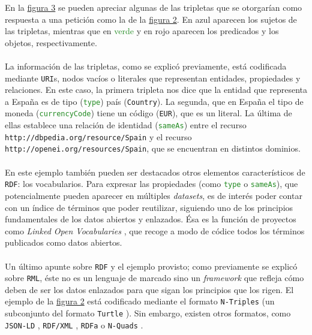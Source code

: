             En la \hyperref[fig:triplets]{figura 3} se pueden apreciar algunas de las tripletas que se otorgarían como respuesta a una petición como la de la \hyperref[fig:linked]{figura 2}. En \textcolor{Cerulean}{azul} aparecen los sujetos de las tripletas, mientras que en \textcolor{ForestGreen}{verde} y en \textcolor{BrickRed}{rojo} aparecen los predicados y los objetos, respectivamente.
            \\ \\
            La información de las tripletas, como se explicó previamente, está codificada mediante \texttt{URI}s, nodos vacíos o literales que representan entidades, propiedades y relaciones. En este caso, la primera tripleta nos dice que la entidad que representa a España es de tipo (\textcolor{ForestGreen}{\texttt{type}}) país (\textcolor{BrickRed}{\texttt{Country}}). La segunda, que en España el tipo de moneda (\textcolor{ForestGreen}{\texttt{currencyCode}}) tiene un código (\textcolor{BrickRed}{\texttt{EUR}}), que es un literal. La última de ellas establece una relación de identidad (\textcolor{ForestGreen}{\texttt{sameAs}}) entre el recurso \textcolor{Cerulean}{\texttt{http://dbpedia.org/resource/Spain}} y el recurso \textcolor{BrickRed}{\texttt{http://openei.org/resources/Spain}}, que se encuentran en distintos dominios.
            \\ \\
            En este ejemplo también pueden ser destacados otros elementos característicos de \texttt{RDF}: los vocabularios. Para expresar las propiedades (como \textcolor{ForestGreen}{\texttt{type}} o \textcolor{ForestGreen}{\texttt{sameAs}}), que potencialmente pueden aparecer en múltiples \textit{datasets}, es de interés poder contar con un índice de términos que poder reutilizar, siguiendo uno de los principios fundamentales de los datos abiertos y enlazados. Ésa es la función de proyectos como \textit{Linked Open Vocabularies} \cite{LOV}, que recoge a modo de códice todos los términos publicados como datos abiertos.
            \\ \\
            Un último apunte sobre \texttt{RDF} y el ejemplo provisto; como previamente se explicó sobre \texttt{RML}, éste no es un lenguaje de marcado sino un \textit{framework} que refleja cómo deben de ser los datos enlazados para que sigan los principios que los rigen. El ejemplo de la \hyperref[fig:linked]{figura 2} está codificado mediante el formato \texttt{N-Triples} \cite{NTRIPLES} (un subconjunto del formato \texttt{Turtle} \cite{TURTLE}). Sin embargo, existen otros formatos, como \texttt{JSON-LD} \cite{JSONLD}, \texttt{RDF/XML} \cite{RDFXML}, \texttt{RDFa} \cite{RDFA} o \texttt{N-Quads} \cite{NQUADS}.
        
